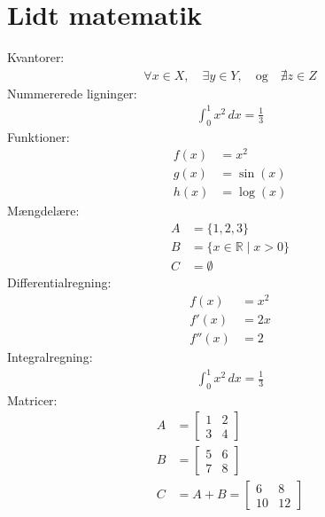 \section{Lidt matematik}
Kvantorer:
\begin{align*}
\forall x \in X, \quad \exists y \in Y, \quad \text{og} \quad \nexists z \in Z
\end{align*}
Nummererede ligninger:
\begin{align}
\int_0^1 x^2 \, dx = \frac{1}{3}
\end{align}
Funktioner:
\begin{align*}
f(x) &= x^2 \\
g(x) &= \sin(x) \\
h(x) &= \log(x)
\end{align*}
Mængdelære:
\begin{align*}
A &= \{1, 2, 3\} \\
B &= \{x \in \mathbb{R} \mid x > 0\} \\
C &= \emptyset
\end{align*}
Differentialregning:
\begin{align*}
f(x) &= x^2 \\
f'(x) &= 2x \\
f''(x) &= 2
\end{align*}
Integralregning:
\begin{align*}
\int_0^1 x^2 \, dx = \frac{1}{3}
\end{align*}
Matricer:
\begin{align*}
A &= \begin{bmatrix}
1 & 2 \\
3 & 4
\end{bmatrix} \\
B &= \begin{bmatrix}
5 & 6 \\
7 & 8
\end{bmatrix} \\
C &= A + B = \begin{bmatrix}
6 & 8 \\
10 & 12
\end{bmatrix}
\end{align*}

